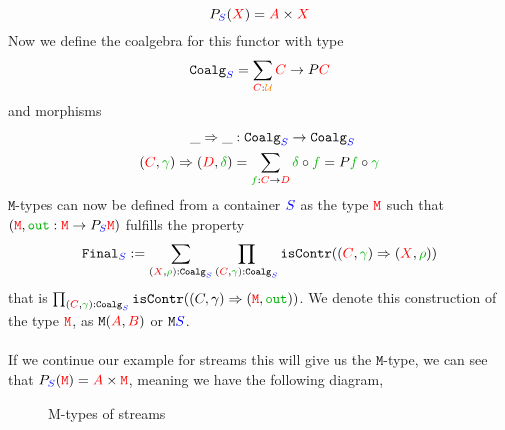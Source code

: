 \documentclass[twoside,11pt,openright]{report}
\newcommand*{\term}[1]{\textcolor{green!70!black}{#1}}
\newcommand*{\type}[1]{\textcolor{red}{#1}}
\newcommand*{\container}[1]{\textcolor{blue}{#1}}
\newcommand*{\universe}[1]{\textcolor{orange}{#1}}
\begin{document}
\begin{equation}
  P_{\container{S}}(\type{X}) = \type{A} \times \type{X}
\end{equation}
Now we define the coalgebra for this functor with type
\begin{equation}
  \mathtt{Coalg}_{\container{S}} = \sum_{\type{C} : \universe{\mathcal{U}}} \type{C} \rightarrow P\type{C}
\end{equation}
and morphisms
\begin{equation}
  \begin{aligned}
    \_\Rightarrow\_ &: \mathtt{Coalg}_{\container{S}} \rightarrow \mathtt{Coalg}_{\container{S}} \\
    (\type{C},\term{\gamma}) \Rightarrow (\type{D},\term{\delta}) &= \sum_{\term{f} : \type{C} \rightarrow \type{D}} \term{\delta} \circ \term{f} = P \term{f} \circ \term{\gamma}
  \end{aligned}
\end{equation}
\(\mathtt{M}\)-types can now be defined from a container \(\container{S}\) as the type \(\type{\mathtt{M}}\) such that \((\type{\mathtt{M}},\term{\mathtt{out}} : \type{\mathtt{M}} \rightarrow P_{\container{S}}\type{\mathtt{M}})\) fulfills the property
\begin{equation}
  \mathtt{Final}_{\container{S}} := \sum_{(\type{X},\term{\rho}) : \mathtt{Coalg}_{\container{S}}} \prod_{{(\type{C},\term{\term{\gamma}}) : \mathtt{Coalg}_{\container{S}}}} \mathtt{isContr}((\type{C},\term{\gamma}) \Rightarrow (\type{X},\term{\rho}))
\end{equation}
that is \(\prod_{(\type{C},\term{\gamma}) : \mathtt{Coalg}_{\container{S}}} \mathtt{isContr}((C,\gamma) \Rightarrow (\type{\mathtt{M}},\term{\mathtt{out}}))\). We denote this construction of the type \(\type{\texttt{M}}\), as \(\texttt{M}(\type{A},\type{B})\) or \(\texttt{M}\container{S}\).
\\ \\
If we continue our example for streams this will give us the \(\mathtt{M}\)-type, we can see that \(P_{\container{S}}(\type{\mathtt{M}}) = \type{A} \times \type{\mathtt{M}}\), meaning we have the following diagram,
\begin{figure}[h]
  \centering
  \caption{M-types of streams}
\end{figure}
\end{document}
